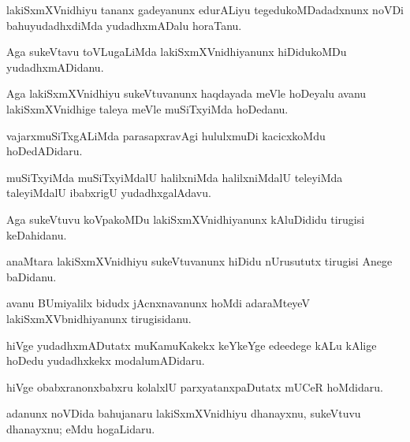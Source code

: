 \documentclass{article}
\begin{document}
\begin{mn}%
lakiSxmXVnidhiyu tananx gadeyanunx edurALiyu tegedukoMDadadxnunx noVDi bahuyudadhxdiMda 
yudadhxmADalu horaTanu.
\end{mn}

\begin{mn}%
Aga sukeVtavu toVLugaLiMda lakiSxmXVnidhiyanunx hiDidukoMDu yudadhxmADidanu.
\end{mn}

\begin{mn}%
Aga lakiSxmXVnidhiyu sukeVtuvanunx haqdayada meVle hoDeyalu avanu lakiSxmXVnidhige taleya 
meVle muSiTxyiMda hoDedanu.
\end{mn}

\begin{mn}%
vajarxmuSiTxgALiMda parasapxravAgi hululxmuDi kacicxkoMdu hoDedADidaru.
\end{mn}

\begin{mn}%
muSiTxyiMda muSiTxyiMdalU halilxniMda halilxniMdalU teleyiMda taleyiMdalU ibabxrigU 
yudadhxgalAdavu.
\end{mn}

\begin{mn}%
Aga sukeVtuvu koVpakoMDu lakiSxmXVnidhiyanunx kAluDididu tirugisi keDahidanu.
\end{mn}

\begin{mn}%
anaMtara lakiSxmXVnidhiyu sukeVtuvanunx hiDidu nUrusututx tirugisi Anege baDidanu.
\end{mn}

\begin{mn}%
avanu BUmiyalilx bidudx jAcnxnavanunx hoMdi adaraMteyeV lakiSxmXVbnidhiyanunx tirugisidanu.
\end{mn}

\begin{mn}%
hiVge yudadhxmADutatx muKamuKakekx keYkeYge edeedege kALu kAlige hoDedu yudadhxkekx 
modalumADidaru.
\end{mn}

\begin{mn}%
hiVge obabxranonxbabxru kolalxlU parxyatanxpaDutatx mUCeR hoMdidaru.
\end{mn}

\begin{mn}%
adanunx noVDida bahujanaru lakiSxmXVnidhiyu dhanayxnu, sukeVtuvu dhanayxnu; eMdu hogaLidaru.
\end{mn}

\end{document}
